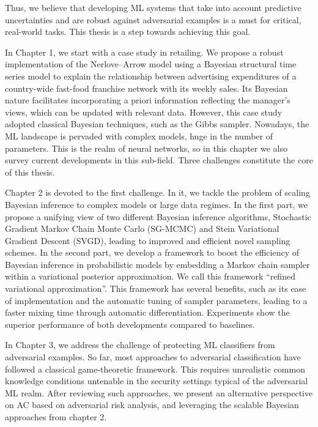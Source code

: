 \documentclass[a4paper, 11pt, openright, twoside]{reportPhD}
\numberwithin{figure}{chapter}
\numberwithin{table}{chapter}
\numberwithin{equation}{chapter}
\begin{document}
Thus, we believe that developing ML systems that take into account predictive uncertainties and are robust against adversarial examples is a must for critical, real-world tasks. This thesis is a step towards achieving this goal. 

In Chapter 1, we start with a case study in retailing. We propose a robust implementation of the Nerlove–Arrow model using a Bayesian structural time series model to explain the relationship between advertising expenditures
of a country-wide fast-food franchise network with its weekly sales. Its Bayesian nature facilitates incorporating a priori information reflecting the manager’s views, which can be updated with relevant data. However, this case study adopted classical Bayesian techniques, such as the Gibbs sampler. Nowadays, the ML landscape is pervaded with complex models, huge in the number of parameters. This is the realm of neural networks, so in this chapter we also survey current developments in this sub-field. Three challenges constitute the core of this thesis.

Chapter 2 is devoted to the first challenge. In it, we tackle the problem of scaling Bayesian inference to complex models or large data regimes. In the first part, we propose a unifying view of two different Bayesian inference algorithms, Stochastic Gradient Markov Chain Monte Carlo (SG-MCMC) and Stein Variational Gradient Descent (SVGD), leading to improved and efficient novel sampling schemes. In the second part, we develop a framework to boost the efficiency of Bayesian inference in probabilistic models by embedding a Markov chain sampler within a variational posterior approximation. We call this framework “refined variational approximation”. This framework has several benefits, such as its ease of implementation and the automatic tuning of sampler parameters, leading to a faster mixing time through automatic differentiation. Experiments show the superior performance of both developments compared to baselines.

In Chapter 3, we address the challenge of protecting ML classifiers from adversarial examples. So far, most approaches to adversarial classification have followed a classical game-theoretic framework. This requires unrealistic common knowledge conditions untenable in the security settings typical of the adversarial ML realm. After reviewing such approaches, we present an alternative perspective on AC based on adversarial risk analysis, and leveraging the scalable Bayesian approaches from chapter 2.
\end{document}
